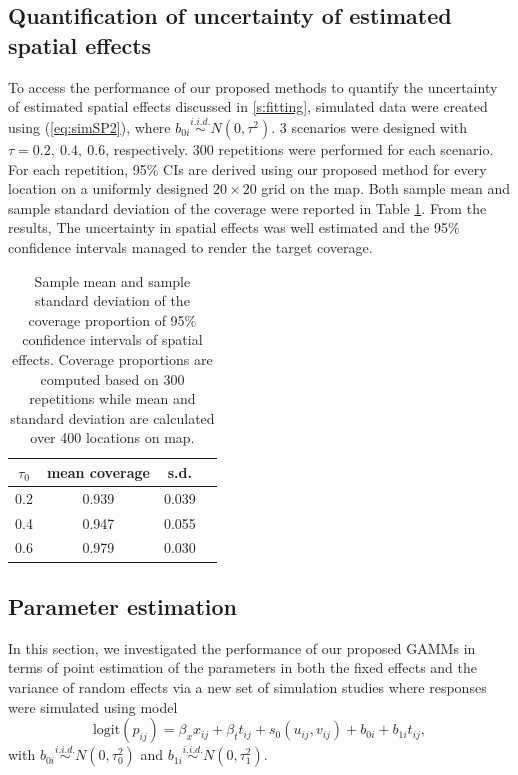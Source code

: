 	\subsection{Quantification of uncertainty of estimated spatial effects}
	To access the performance of our proposed methods to quantify the uncertainty of estimated spatial effects discussed in \ref{s:fitting}, simulated data were created using (\ref{eq:simSP2}), where $b_{0i} \stackrel{i.i.d.}{\sim} N(0,\tau^2)$. 3 scenarios were designed with $\tau=0.2,\ 0.4,\ 0.6$, respectively. 300 repetitions were performed for each scenario. For each repetition, 95\% CIs are derived using our proposed method for every location on a uniformly designed $20\times 20$ grid on the map. Both sample mean and sample standard deviation of the coverage were reported in Table \ref{t:sim3coverage}. From the results, The uncertainty in spatial effects was well estimated and the 95\% confidence intervals managed to render the target coverage. 
	
	\begin{table}[h]
		\caption{Sample mean and sample standard deviation of the coverage proportion of 95\% confidence intervals of spatial effects. Coverage proportions are computed based on 300 repetitions while mean and standard deviation are calculated over 400 locations on map.
			\label{t:sim3coverage}}
		\centering
		\begin{tabular}{cccc}
			\hline
			$\tau_0$ & mean coverage & s.d. \\
			\hline
			0.2 &  0.939 & 0.039\\
			0.4 &  0.947 & 0.055\\
			0.6 &  0.979 & 0.030\\
			\hline
		\end{tabular}
	\end{table}
	
	\subsection{Parameter estimation}
	In this section, we investigated the performance of our proposed GAMMs in terms of point estimation of the parameters in both the fixed effects and the variance of random effects via a new set of simulation studies where responses were simulated using model 
	\begin{equation}\label{eq:simrand}
	\text{logit}(p_{ij}) = \beta_x x_{ij} + \beta_t t_{ij} + s_0(u_{ij},v_{ij}) + b_{0i} + b_{1i}t_{ij},
	\end{equation}
	with $b_{0i} \stackrel{i.i.d.}{\sim} N(0,\tau_{0}^2)$ and $b_{1i} \stackrel{i.i.d.}{\sim} N(0,\tau_{1}^2)$.
	
